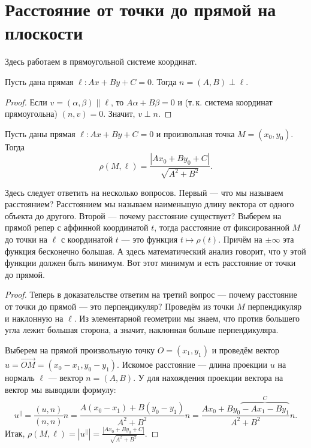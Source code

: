 \section{Расстояние от точки до прямой на плоскости}

Здесь работаем в прямоугольной системе координат.

\begin{lemma}
    Пусть дана прямая $\ell: Ax + By + C = 0$. Тогда $n = (A, B) \perp \ell$.
\end{lemma}

\begin{proof}
    Если $v = (\alpha, \beta) \parallel \ell$, то $A\alpha + B\beta = 0$ и (т.\,к. система координат прямоугольна) $(n, v) = 0$. Значит, $v \perp n$.
\end{proof}

\begin{theorem}
    Пусть даны прямая $\ell: Ax + By + C = 0$ и произвольная точка $M = (x_0, y_0)$. Тогда
    $$
    \rho(M, \ell) = \frac{|Ax_0 + By_0 + C|}{\sqrt{A^2 + B^2}}.
    $$
\end{theorem}

Здесь следует ответить на несколько вопросов. Первый --- что мы называем расстоянием? Расстоянием мы называем наименьшую длину вектора от одного объекта до другого. Второй --- почему расстояние существует? Выберем на прямой репер с аффинной координатой $t$, тогда расстояние от фиксированной $M$ до точки на $\ell$ с координатой $t$ --- это функция $t \mapsto \rho(t)$. Причём на $\pm\infty$ эта функция бесконечно большая. А здесь математический анализ говорит, что у этой функции должен быть минимум. Вот этот минимум и есть расстояние от точки до прямой.

\begin{proof}
    Теперь в доказательстве ответим на третий вопрос --- почему расстояние от точки до прямой --- это перпендикуляр? Проведём из точки $M$ перпендикуляр и наклонную на $\ell$. Из элементарной геометрии мы знаем, что против большего угла лежит большая сторона, а значит, наклонная больше перпендикуляра.

    Выберем на прямой произвольную точку $O = (x_1, y_1)$ и проведём вектор $u = \overrightarrow{OM} = (x_0 - x_1, y_0 - y_1)$. Искомое расстояние --- длина проекции $u$ на нормаль $\ell$ --- вектор $n = (A, B)$. У для нахождения проекции вектора на вектор мы выводили формулу:
    $$
    u^\parallel = \frac{(u, n)}{(n, n)}n = \frac{A(x_0 - x_1) + B(y_0 - y_1)}{A^2 + B^2}n = \frac{Ax_0 + By_0 \overbrace{{} - Ax_1 - By_1}^{C}}{A^2 + B^2}n.
    $$
    Итак, $\displaystyle\rho(M, \ell) = |u^\parallel| = \frac{|Ax_0 + By_0 + C|}{\sqrt{A^2 + B^2}}$.
\end{proof}

